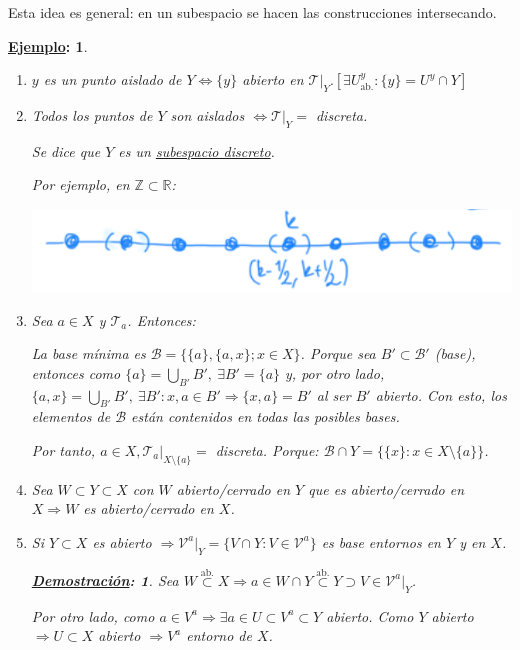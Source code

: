\documentclass[10pt,a4paper,openright]{book}
\theoremstyle{break}
\newtheorem*{demo}{\underline{Demostración}:}
\newtheorem*{ej}{\underline{Ejemplo}:}
\begin{document}
Esta idea es general: en un subespacio se hacen las construcciones intersecando.

\begin{ej}
\begin{enumerate}
    \item $y$ es un punto aislado de $Y \Leftrightarrow \{y\}$ abierto en $\mathcal{T}|_Y. \left[ \exists U^y_{\text{ab.}}: \{y\} = U^y \cap Y \right]$

    \item Todos los puntos de $Y$ son aislados $\Leftrightarrow \mathcal{T}|_Y = $ discreta.

    Se dice que $Y$ es un \underline{subespacio discreto}. 

    Por ejemplo, en $\mathbb{Z} \subset \mathbb{R}$:
    \begin{center}
        \includegraphics[scale=0.3]{images/def_subespacio_discreto} 
    \end{center}

    \item Sea $a \in X$ y $\mathcal{T}_a$. Entonces:

    La base mínima es $\mathcal{B} = \{\{a\} , \{a, x\}; x \in X\}$. Porque sea $B' \subset \mathcal{B}'$ (base), entonces como $\{a\} = \bigcup_{B'} B',\ \exists B' = \{a\}$ y, por otro lado, $\{a, x\} = \bigcup_{B'} B',\ \exists B': x, a \in B' \Rightarrow \{x, a\} = B'$ al ser $B'$ abierto. Con esto, los elementos de $\mathcal{B}$ están contenidos en todas las posibles bases.

    Por tanto, $a \in X, \mathcal{T}_a|_{X \setminus \{a\}} = $ discreta. Porque: $\mathcal{B} \cap Y = \{\{x\}: x \in X\setminus \{a\}\}$.

    \item Sea $W \subset Y \subset X$ con $W$ abierto/cerrado en $Y$ que es abierto/cerrado en $X \Rightarrow W$ es abierto/cerrado en $X$.

    \item Si $Y \subset X$ es abierto $\Rightarrow \mathcal{V}^a|_Y = \{V \cap Y : V \in \mathcal{V}^a\} $ es base entornos en $Y$ y en $X$.
    \begin{demo}
        Sea $W \stackrel{\text{ab.}}{\subset } X \Rightarrow a \in W \cap Y \stackrel{\text{ab.}}{\subset } Y \supset V \in \mathcal{V}^a|_Y$.

        Por otro lado, como $a \in V^a \Rightarrow \exists a \in U \subset V^a \subset Y$ abierto. Como $Y$ abierto $\Rightarrow U \subset X$ abierto $\Rightarrow V^a$ entorno de $X$.
    \end{demo}
\end{enumerate}
\end{ej}
\end{document}
